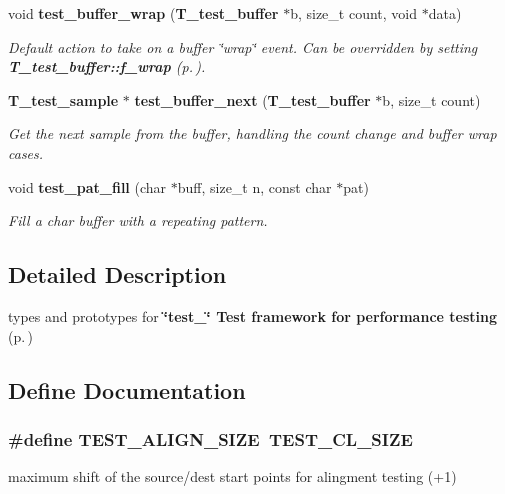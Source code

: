 \begin{CompactItemize}
void {\bf test\_\-buffer\_\-wrap} ({\bf T\_\-test\_\-buffer} $\ast$b, size\_\-t count, void $\ast$data)
\begin{CompactList}\small\item\em Default action to take on a buffer \char`\"{}wrap\char`\"{} event. Can be overridden by setting {\bf T\_\-test\_\-buffer::f\_\-wrap} {\rm (p.\,\pageref{structT__test__buffer_m20})}.\item\end{CompactList}\item 
{\bf T\_\-test\_\-sample} $\ast$ {\bf test\_\-buffer\_\-next} ({\bf T\_\-test\_\-buffer} $\ast$b, size\_\-t count)
\begin{CompactList}\small\item\em Get the next sample from the buffer, handling the count change and buffer wrap cases.\item\end{CompactList}\item 
void {\bf test\_\-pat\_\-fill} (char $\ast$buff, size\_\-t n, const char $\ast$pat)
\begin{CompactList}\small\item\em Fill a char buffer with a repeating pattern.\item\end{CompactList}\end{CompactItemize}


\subsection{Detailed Description}
types and prototypes for {\bf \char`\"{}test\_\-\char`\"{} Test framework for performance testing} {\rm (p.\,\pageref{group__test})}





\subsection{Define Documentation}
\subsubsection{\setlength{\rightskip}{0pt plus 5cm}\#define TEST\_\-ALIGN\_\-SIZE\ TEST\_\-CL\_\-SIZE}\label{test__utils_8h_a12}


maximum shift of the source/dest start points for alingment testing (+1) 
